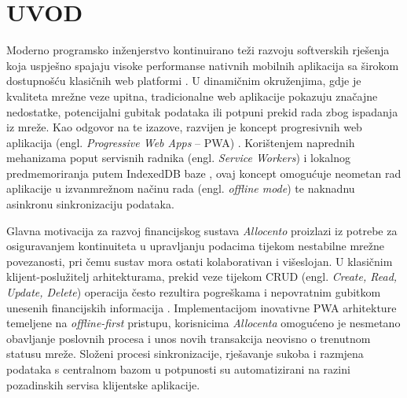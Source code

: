 \documentclass[a4paper,12pt,oneside]{article}
\begin{document}
	
	
	
	
	
	
	
	
	
	
	{
		\hypersetup{linkcolor=black}
		\tableofcontents
	}
	
	
	
	\newpage
	
	\section{UVOD}
	Moderno programsko inženjerstvo kontinuirano teži razvoju softverskih rješenja koja uspješno spajaju visoke performanse nativnih mobilnih aplikacija sa širokom dostupnošću klasičnih web platformi \cite{w_angular}. U dinamičnim okruženjima, gdje je kvaliteta mrežne veze upitna, tradicionalne web aplikacije pokazuju značajne nedostatke, potencijalni gubitak podataka ili potpuni prekid rada zbog ispadanja iz mreže. Kao odgovor na te izazove, razvijen je koncept progresivnih web aplikacija (engl. \textit{Progressive Web Apps} – PWA) \cite{w_pwa_alex_russell}. Korištenjem naprednih mehanizama poput servisnih radnika (engl. \textit{Service Workers}) \cite{w_mdn_serviceworker} i lokalnog predmemoriranja putem IndexedDB baze \cite{w_mdn_indexeddb}, ovaj koncept omogućuje neometan rad aplikacije u izvanmrežnom načinu rada (engl. \textit{offline mode}) te naknadnu asinkronu sinkronizaciju podataka.

	Glavna motivacija za razvoj financijskog sustava \textit{Allocento} proizlazi iz potrebe za osiguravanjem kontinuiteta u upravljanju podacima tijekom nestabilne mrežne povezanosti, pri čemu sustav mora ostati kolaborativan i višeslojan. U klasičnim klijent-poslužitelj arhitekturama, prekid veze tijekom CRUD (engl. \textit{Create, Read, Update, Delete}) operacija često rezultira pogreškama i nepovratnim gubitkom unesenih financijskih informacija \cite{w_rest_api}. Implementacijom inovativne PWA arhitekture temeljene na \textit{offline-first} pristupu, korisnicima \textit{Allocenta} omogućeno je nesmetano obavljanje poslovnih procesa i unos novih transakcija neovisno o trenutnom statusu mreže. Složeni procesi sinkronizacije, rješavanje sukoba i razmjena podataka s centralnom bazom u potpunosti su automatizirani na razini pozadinskih servisa klijentske aplikacije.
\end{document}
